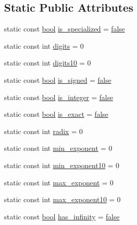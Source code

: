 \subsection*{Static Public Attributes}
\begin{DoxyCompactItemize}
\item 
static const \hyperlink{compiler_8h_abb452686968e48b67397da5f97445f5b}{bool} \hyperlink{class__Numeric__limits__base_a16f54a874c886c7a9bb51e6a5ccf025c}{is\+\_\+specialized} = \hyperlink{compiler_8h_a65e9886d74aaee76545e83dd09011727}{false}
\item 
static const int \hyperlink{class__Numeric__limits__base_add1991ae0dbfd0db80b003cef960add8}{digits} = 0
\item 
static const int \hyperlink{class__Numeric__limits__base_a91ec13f221fb34f8912e120f6ff9d547}{digits10} = 0
\item 
static const \hyperlink{compiler_8h_abb452686968e48b67397da5f97445f5b}{bool} \hyperlink{class__Numeric__limits__base_a8ec6556a2cfa7db8922c44806de5fc16}{is\+\_\+signed} = \hyperlink{compiler_8h_a65e9886d74aaee76545e83dd09011727}{false}
\item 
static const \hyperlink{compiler_8h_abb452686968e48b67397da5f97445f5b}{bool} \hyperlink{class__Numeric__limits__base_a5b4c871c8036c4e2b130820e586de6c3}{is\+\_\+integer} = \hyperlink{compiler_8h_a65e9886d74aaee76545e83dd09011727}{false}
\item 
static const \hyperlink{compiler_8h_abb452686968e48b67397da5f97445f5b}{bool} \hyperlink{class__Numeric__limits__base_a4c09679f8c1d2e4603494f9450059fa9}{is\+\_\+exact} = \hyperlink{compiler_8h_a65e9886d74aaee76545e83dd09011727}{false}
\item 
static const int \hyperlink{class__Numeric__limits__base_ae0a3d6a224b58fe3a32cdfbbb3498896}{radix} = 0
\item 
static const int \hyperlink{class__Numeric__limits__base_a33abfbbaf02a0ea0080f687bec916dc3}{min\+\_\+exponent} = 0
\item 
static const int \hyperlink{class__Numeric__limits__base_a16a17ce6c19c5c4c811bd226a8a66a7d}{min\+\_\+exponent10} = 0
\item 
static const int \hyperlink{class__Numeric__limits__base_ae22a7d4a4619fd7e01cd8171b5a41f28}{max\+\_\+exponent} = 0
\item 
static const int \hyperlink{class__Numeric__limits__base_a76cf75d2e3becdc0f2e1db245ca408fb}{max\+\_\+exponent10} = 0
\item 
static const \hyperlink{compiler_8h_abb452686968e48b67397da5f97445f5b}{bool} \hyperlink{class__Numeric__limits__base_aaae027c5b3f7b882c1e1a03a955ed736}{has\+\_\+infinity} = \hyperlink{compiler_8h_a65e9886d74aaee76545e83dd09011727}{false}

\end{DoxyCompactItemize}
